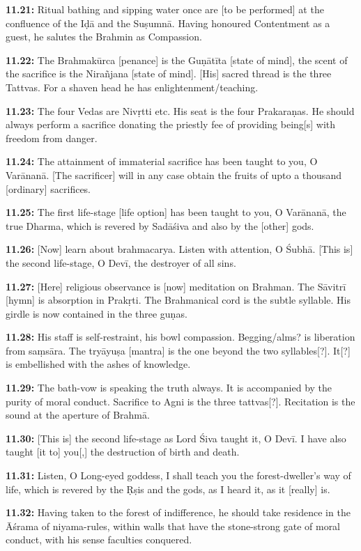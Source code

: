 \documentclass{article}
\newcommand{\vsnum}[1]{\textbf{#1}}
\begin{document}
\vsnum{11.21: }Ritual bathing and sipping water once are [to be performed] at the confluence of the Iḍā and the Suṣumnā. Having honoured Contentment as a guest, he salutes the Brahmin as Compassion.

\vsnum{11.22: }The Brahmakūrca [penance] is the Guṇātīta [state of mind], the scent of the sacrifice is the Nirañjana [state of mind]. [His] sacred thread is the three Tattvas. For a shaven head he has enlightenment/teaching.

\vsnum{11.23: }The four Vedas are Nivṛtti etc. His seat is the four Prakaraṇas. He should always perform a sacrifice donating the priestly fee of providing being[s] with freedom from danger.

\vsnum{11.24: }The attainment of immaterial sacrifice has been taught to you, O Varānanā. [The sacrificer] will in any case obtain the fruits of upto a thousand [ordinary] sacrifices.

\vsnum{11.25: }The first life-stage [life option] has been taught to you, O Varānanā, the true Dharma, which is revered by Sadāśiva and also by the [other] gods.

\vsnum{11.26: }[Now] learn about brahmacarya. Listen with attention, O Śubhā. [This is] the second life-stage, O Devī, the destroyer of all sins.

\vsnum{11.27: }[Here] religious observance is [now] meditation on Brahman. The Sāvitrī [hymn] is absorption in Prakṛti. The Brahmanical cord is the subtle syllable. His girdle is now contained in the three guṇas.

\vsnum{11.28: }His staff is self-restraint, his bowl compassion. Begging/alms? is liberation from saṃsāra. The tryāyuṣa [mantra] is the one beyond the two syllables[?]. It[?] is embellished with the ashes of knowledge.

\vsnum{11.29: }The bath-vow is speaking the truth always. It is accompanied by the purity of moral conduct. Sacrifice to Agni is the three tattvas[?]. Recitation is the sound at the aperture of Brahmā.

\vsnum{11.30: }[This is] the second life-stage as Lord Śiva taught it, O Devī. I have also taught [it to] you[,] the destruction of birth and death.

\vsnum{11.31: }Listen, O Long-eyed goddess, I shall teach you the forest-dweller's way of life, which is revered by the Ṛṣis and the gods, as I heard it, as it [really] is.

\vsnum{11.32: }Having taken to the forest of indifference, he should take residence in the Āśrama of niyama-rules, within walls that have the stone-strong gate of moral conduct, with his sense faculties conquered.
\end{document}
